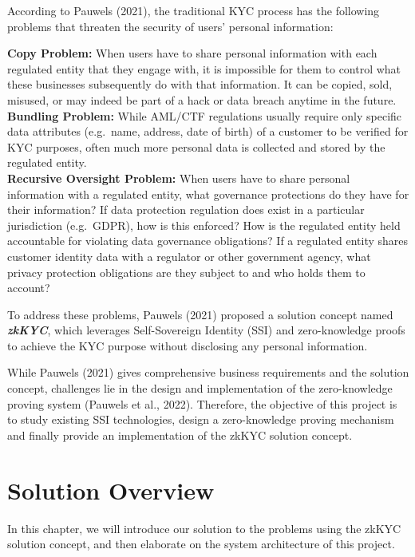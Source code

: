 \documentclass[
]{report}
\begin{document}
According to Pauwels (2021), the traditional KYC process has the
following problems that threaten the security of users' personal
information:

\begin{myquote}
\textbf{Copy Problem:} When users have to share personal
information with each regulated entity that they engage with, it is
impossible for them to control what these businesses subsequently do
with that information. It can be copied, sold, misused, or may indeed be
part of a hack or data breach anytime in the future.\\
\textbf{Bundling Problem:} While AML/CTF regulations usually
require only specific data attributes (e.g.~name, address, date of
birth) of a customer to be verified for KYC purposes, often much more
personal data is collected and stored by the regulated entity.\\
\textbf{Recursive Oversight Problem:} When users have to share
personal information with a regulated entity, what governance
protections do they have for their information? If data protection
regulation does exist in a particular jurisdiction (e.g.~GDPR), how is
this enforced? How is the regulated entity held accountable for
violating data governance obligations? If a regulated entity shares
customer identity data with a regulator or other government agency, what
privacy protection obligations are they subject to and who holds them to
account?
\end{myquote}

To address these problems, Pauwels (2021) proposed a solution concept
named \textbf{\emph{zkKYC}}, which leverages Self-Sovereign Identity
(SSI) and zero-knowledge proofs to achieve the KYC purpose without
disclosing any personal information.

While Pauwels (2021) gives comprehensive business requirements and the
solution concept, challenges lie in the design and implementation of the
zero-knowledge proving system (Pauwels et al., 2022). Therefore, the
objective of this project is to study existing SSI technologies, design
a zero-knowledge proving mechanism and finally provide an implementation
of the zkKYC solution concept.

\chapter{Solution Overview} \label{solutionoverview}
In this chapter, we will introduce our solution to the problems using
the zkKYC solution concept, and then elaborate on the system
architecture of this project.
\end{document}
